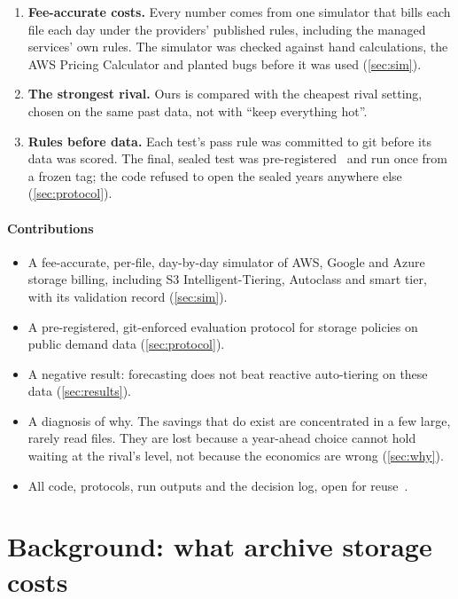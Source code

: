 \documentclass[11pt]{article}
\begin{document}
\begin{enumerate}[label=(\arabic*)]
  \item \textbf{Fee-accurate costs.} Every number comes from one simulator that bills each file each day under the providers' published rules, including the managed services' own rules. The simulator was checked against hand calculations, the AWS Pricing Calculator and planted bugs before it was used (\cref{sec:sim}).
  \item \textbf{The strongest rival.} Ours is compared with the cheapest rival setting, chosen on the same past data, not with ``keep everything hot''.
  \item \textbf{Rules before data.} Each test's pass rule was committed to git before its data was scored. The final, sealed test was pre-registered~\cite{nosek2018preregistration} and run once from a frozen tag; the code refused to open the sealed years anywhere else (\cref{sec:protocol}).
\end{enumerate}

\paragraph{Contributions}
\begin{itemize}
  \item A fee-accurate, per-file, day-by-day simulator of AWS, Google and Azure storage billing, including S3 Intelligent-Tiering, Autoclass and smart tier, with its validation record (\cref{sec:sim}).
  \item A pre-registered, git-enforced evaluation protocol for storage policies on public demand data (\cref{sec:protocol}).
  \item A negative result: forecasting does not beat reactive auto-tiering on these data (\cref{sec:results}).
  \item A diagnosis of why. The savings that do exist are concentrated in a few large, rarely read files. They are lost because a year-ahead choice cannot hold waiting at the rival's level, not because the economics are wrong (\cref{sec:why}).
  \item All code, protocols, run outputs and the decision log, open for reuse~\cite{repo}.
\end{itemize}

\section{Background: what archive storage costs}
\label{sec:background}
\end{document}
